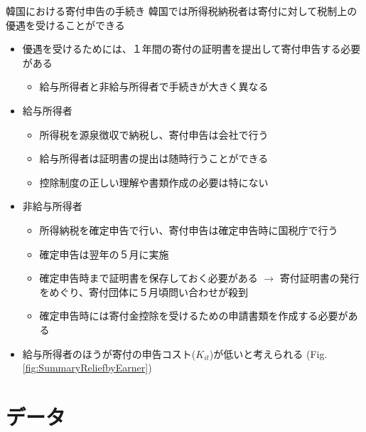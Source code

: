 \documentclass[
  ignorenonframetext,
  aspectratio=169,
]{beamer}
\providecommand{\tightlist}{%
  \setlength{\itemsep}{0pt}\setlength{\parskip}{0pt}}
\begin{document}
\begin{frame}{韓国における寄付申告の手続き}
\protect\hypertarget{ux97d3ux56fdux306bux304aux3051ux308bux5bc4ux4ed8ux7533ux544aux306eux624bux7d9aux304d}{}
韓国では所得税納税者は寄付に対して税制上の優遇を受けることができる

\begin{itemize}
\tightlist
\item
  優遇を受けるためには、１年間の寄付の証明書を提出して寄付申告する必要がある

  \begin{itemize}
  \tightlist
  \item
    給与所得者と非給与所得者で手続きが大きく異なる
  \end{itemize}
\item
  給与所得者

  \begin{itemize}
  \tightlist
  \item
    所得税を源泉徴収で納税し、寄付申告は会社で行う
  \item
    給与所得者は証明書の提出は随時行うことができる
  \item
    控除制度の正しい理解や書類作成の必要は特にない
  \end{itemize}
\item
  非給与所得者

  \begin{itemize}
  \tightlist
  \item
    所得納税を確定申告で行い、寄付申告は確定申告時に国税庁で行う
  \item
    確定申告は翌年の５月に実施
  \item
    確定申告時まで証明書を保存しておく必要がある \(\to\) 寄付証明書の発行をめぐり、寄付団体に５月頃問い合わせが殺到
  \item
    確定申告時には寄付金控除を受けるための申請書類を作成する必要がある
  \end{itemize}
\item
  給与所得者のほうが寄付の申告コスト(\(K_{it}\))が低いと考えられる (Fig. \ref{fig:SummaryReliefbyEarner})
\end{itemize}
\end{frame}

\hypertarget{ux30c7ux30fcux30bf}{%
\section{データ}\label{ux30c7ux30fcux30bf}}
\end{document}
